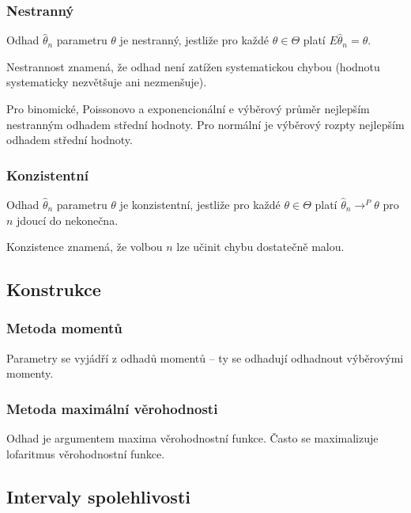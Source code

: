 \subsubsection*{Nestranný}

Odhad $\hat{\theta}_n$ parametru $\theta$ je nestranný, jestliže pro každé $\theta \in \Theta$ platí $E\hat{\theta}_n = \theta$.

Nestrannost znamená, že odhad není zatížen systematickou chybou (hodnotu systematicky nezvětšuje ani nezmenšuje).

Pro binomické, Poissonovo a exponencionální e výběrový průměr nejlepším nestranným odhadem střední hodnoty.
Pro normální je výběrový rozpty nejlepším odhadem střední hodnoty.

\subsubsection*{Konzistentní}

Odhad $\hat{\theta}_n$ parametru $\theta$ je konzistentní, jestliže pro každé $\theta \in \Theta$ platí $\hat{\theta}_n \rightarrow^{P}\theta$ pro $n$ jdoucí do nekonečna.

Konzistence znamená, že volbou $n$ lze učinit chybu dostatečně malou.

\subsection{Konstrukce}

\subsubsection*{Metoda momentů}

Parametry se vyjádří z odhadů momentů -- ty se odhadují odhadnout výběrovými momenty.

\subsubsection*{Metoda maximální věrohodnosti}

Odhad je argumentem maxima věrohodnostní funkce.
Často se maximalizuje lofaritmus věrohodnostní funkce.

\subsection{Intervaly spolehlivosti}
